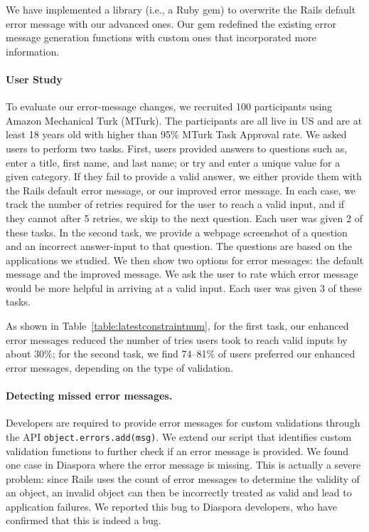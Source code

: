 
We have implemented a library (i.e., a Ruby gem) to overwrite the Rails default error message with our advanced ones. Our gem redefined the existing error message generation functions with custom ones that incorporated more information. 

\paragraph{User Study} To evaluate our error-message changes, we recruited 100 participants using Amazon Mechanical Turk (MTurk). The participants are all live in US and are at least 18 years old with higher than 95\% MTurk Task Approval rate.
We asked users to perform two tasks. First, users provided answers to questions such as, enter a title, first name, and last name; or try and enter a unique value for a given category. If they fail to provide a valid answer, we either provide them with the Rails default error message, or our improved error message. In each case, we track the number of retries required for the user to reach a valid input, and if they cannot after 5 retries, we skip to the next question. Each user was given 2 of these tasks.
In the second task, we provide a webpage screenshot of a question and an incorrect answer-input to that question. The questions are based on the applications we studied. We then show two options for error messages: the default message and the improved  message. We ask the user to rate which error message would be more helpful in arriving at a valid input. Each user was given 3 of these tasks.

 As shown in Table~\ref{table:latestconstraintnum},  
for the first task, our enhanced error messages reduced the number of tries users took to reach valid inputs by about 30\%;
for the second task, we find 74--81\% of users preferred our enhanced error messages, depending on the type of validation.



\paragraph{\bf Detecting missed error messages.} Developers are required to provide error messages for 
custom validations through the API {\tt object.errors.add(msg)}. We extend our script that identifies custom validation functions to further check
if an error message is provided.
We found one case in Diaspora where the error message is missing. This is actually a severe problem:
since Rails uses the count of error messages to determine the validity of an object, an invalid object
can then be incorrectly treated as valid and lead to application failures. 
We reported this bug to Diaspora developers, who have confirmed that this is indeed a bug.

